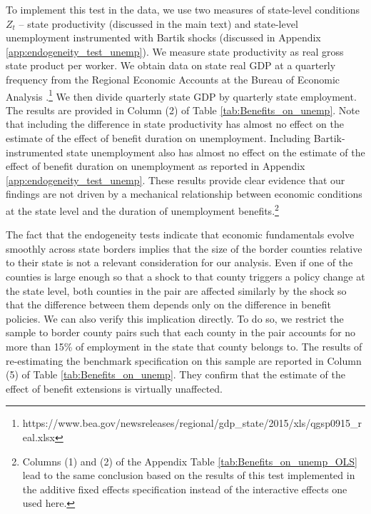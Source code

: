 \documentclass[12pt]{article}
\newcommand{\1}{\mathbf{1}}
\begin{document}
To implement this test in the data, we use two measures of state-level conditions $Z_t$ -- state productivity (discussed in the main text) and state-level unemployment instrumented with Bartik shocks (discussed in Appendix \ref{app:endogeneity_test_unemp}). We measure state productivity as real gross state product per worker.  We obtain data on state real GDP at a quarterly frequency from the Regional Economic Accounts at the Bureau of Economic Analysis \citep{data:bea-gdp-state}.\footnote{https://www.bea.gov/newsreleases/regional/gdp\_state/2015/xls/qgsp0915\_real.xlsx} We then divide quarterly state GDP by quarterly state employment. The results are provided in Column (2) of Table \ref{tab:Benefits_on_unemp}. Note that including the difference in state productivity has almost no effect on the estimate of the effect of benefit duration on unemployment. Including Bartik-instrumented state unemployment also has almost no effect on the estimate of the effect of benefit duration on unemployment as reported in Appendix \ref{app:endogeneity_test_unemp}. These results provide clear evidence that our findings are not driven by a mechanical relationship between economic conditions at the state level and the duration of unemployment benefits.\footnote{Columns (1) and (2) of the Appendix Table \ref{tab:Benefits_on_unemp_OLS} lead to the same conclusion based on the results of this test implemented in the additive fixed effects specification instead of the interactive effects one used here.}

The fact that the endogeneity tests indicate that economic fundamentals evolve smoothly across state borders implies that the size of the border counties relative to their state is not a relevant consideration for our analysis. Even if one of the counties is large enough so that a shock to that county triggers a policy change at the state level, both counties in the pair are affected similarly by the shock so that the difference between them depends only on the difference in benefit policies. We can also verify this implication directly. To do so, we restrict the sample to border county pairs such that each county in the pair accounts for no more than 15\% of employment in the state that county belongs to. The results of re-estimating the benchmark specification on this sample are reported in Column (5) of Table  \ref{tab:Benefits_on_unemp}. They confirm that the estimate of the effect of benefit extensions is virtually unaffected.



\end{document}
